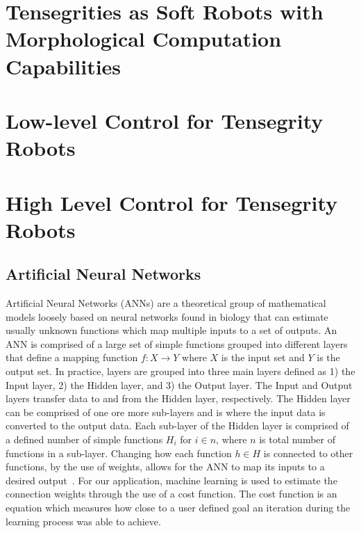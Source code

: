 \section{Tensegrities as Soft Robots with Morphological Computation Capabilities}
\label{sec:robots}


\section{Low-level Control for Tensegrity Robots}
\label{sec:control}


\section{High Level Control for Tensegrity Robots}
\label{sec:NN_and_Planning_overview}

\subsection{Artificial Neural Networks}
\label{sec:ann}
Artificial Neural Networks (ANNs) are a theoretical group of mathematical models loosely based on neural networks found in biology that can estimate usually unknown functions which map multiple inputs to a set of outputs.
An ANN is comprised of a large set of simple functions grouped into different layers that define a mapping function \(f:X \to Y\) where \(X\) is the input set and \(Y\) is the output set.
In practice, layers are grouped into three main layers defined as 1) the Input layer, 2) the Hidden layer, and 3) the Output layer.
The Input and Output layers transfer data to and from the Hidden layer, respectively.
The Hidden layer can be comprised of one ore more sub-layers and is where the input data is converted to the output data.
Each sub-layer of the Hidden layer is comprised of a defined number of simple functions \(H_{i}\) for \(i \in n\), where \(n\) is total number of functions in a sub-layer.
Changing how each function \(h \in H\) is connected to other functions, by the use of weights, allows for the ANN to map its inputs to a desired output~\cite{lippmann1987introduction}. For our application, machine learning is used to estimate the connection weights through the use of a cost function.
The cost function is an equation which measures how close to a user defined goal an iteration during the learning process was able to achieve.

